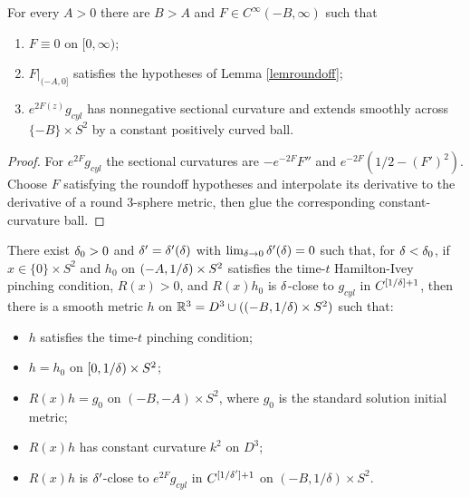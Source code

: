 \begin{lemma}
  \label{lem:kl-surgery-pinching-condition-positivity-ricci-flow-surgery}
 \label{capoff}
For every $A>0$ there are $B>A$ and $F\in C^\infty(-B,\infty)$ such that
\begin{enumerate}
\item $F\equiv0$ on $[0,\infty)$;
\item $F|_{(-A,0]}$ satisfies the hypotheses of Lemma \ref{lemroundoff};
\item $e^{2F(z)}g_{cyl}$ has nonnegative sectional curvature and extends
smoothly across $\{-B\}\times S^2$ by a constant positively curved ball.
\end{enumerate}
\end{lemma}
\begin{proof}
\sketch For $e^{2F}g_{cyl}$ the sectional curvatures are
$-e^{-2F}F''$ and $e^{-2F}(1/2-(F')^2)$. Choose $F$ satisfying the
roundoff hypotheses and interpolate its derivative to the derivative of a
round $3$-sphere metric, then glue the corresponding constant-curvature ball.
\end{proof}

\begin{lemma}
  \label{lem:kl-surgery-pinching-condition-existence-standard-solutions}
\label{preservingphipinching}
There exist $\delta_0>0$ and $\delta'=\delta'(\delta)$ with
$\lim_{\delta\rightarrow0}\delta'(\delta)=0$ such that, for $\delta<\delta_0$, if
$x\in\{0\}\times S^2$ and $h_0$ on $(-A,1/\delta)\times S^2$ satisfies the
time-$t$ Hamilton-Ivey pinching condition, $R(x)>0$, and
$R(x)h_0$ is $\delta$-close to $g_{cyl}$ in $C^{[1/\delta]+1}$, then there is a
smooth metric $h$ on ${\mathbb R}^3=D^3\cup((-B,1/\delta)\times S^2)$ such that:
\begin{itemize}
\item $h$ satisfies the time-$t$ pinching condition;
\item $h=h_0$ on $[0,1/\delta)\times S^2$;
\item $R(x)h=g_0$ on $(-B,-A)\times S^2$, where $g_0$ is the standard
solution initial metric;
\item $R(x)h$ has constant curvature $k^2$ on $D^3$;
\item $R(x)h$ is $\delta'$-close to $e^{2F}g_{cyl}$ in
$C^{[1/\delta']+1}$ on $(-B,1/\delta)\times S^2$.
\end{itemize}
\end{lemma}

